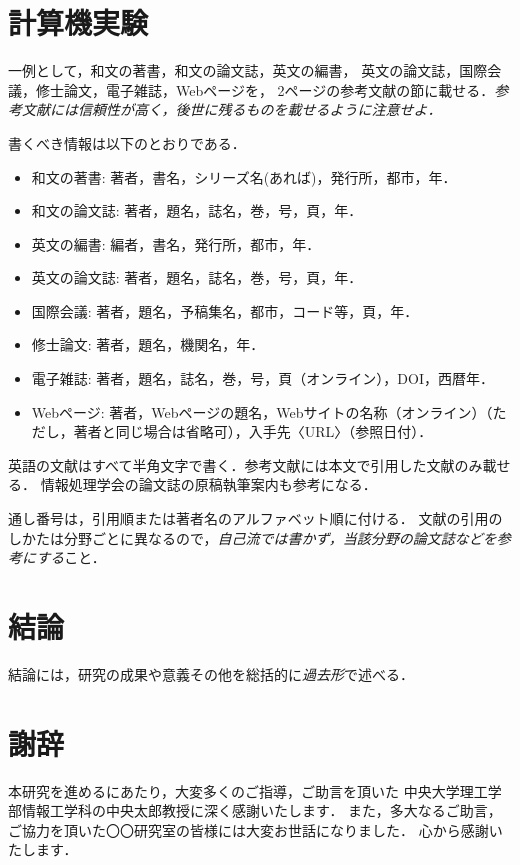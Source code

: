 \documentclass[a4j,12pt]{jreport}
\def\syaji{ \chapter*{謝辞} \addcontentsline{toc}{chapter}{謝辞}}
\begin{document}
\chapter{計算機実験} \label{chapter:5}

一例として，和文の著書\cite{suetake}，和文の論文誌\cite{kusano}，英文の編書\cite{fuortes}，
英文の論文誌\cite{rice}，国際会議\cite{guibas}，修士論文\cite{chudai}，電子雑誌\cite{iwama}，Webページ\cite{IPSJ}を，
2ページの参考文献の節に載せる．{\em 参考文献には信頼性が高く，後世に残るものを載せるように注意せよ．}

書くべき情報は以下のとおりである．
\begin{itemize}
\item 和文の著書: 著者，書名，シリーズ名(あれば)，発行所，都市，年．
\item 和文の論文誌: 著者，題名，誌名，巻，号，頁，年．
\item 英文の編書: 編者，書名，発行所，都市，年．
\item 英文の論文誌: 著者，題名，誌名，巻，号，頁，年．
\item 国際会議: 著者，題名，予稿集名，都市，コード等，頁，年．
\item 修士論文: 著者，題名，機関名，年．
\item 電子雑誌: 著者，題名，誌名，巻，号，頁（オンライン），DOI，西暦年．
\item Webページ: 著者，Webページの題名，Webサイトの名称（オンライン）（ただし，著者と同じ場合は省略可），入手先〈URL〉（参照日付）．
\end{itemize}
英語の文献はすべて半角文字で書く．参考文献には本文で引用した文献のみ載せる．
情報処理学会の論文誌の原稿執筆案内\cite{IPSJ}も参考になる．

通し番号は，引用順または著者名のアルファベット順に付ける．
文献の引用のしかたは分野ごとに異なるので，{\em 自己流では書かず，当該分野の論文誌などを参考にする}こと．



\chapter{結論} \label{chapter:6}

結論には，研究の成果や意義その他を総括的に{\em 過去形}で述べる．



\syaji
\par
本研究を進めるにあたり，大変多くのご指導，ご助言を頂いた
中央大学理工学部情報工学科の中央太郎教授に深く感謝いたします．
また，多大なるご助言，ご協力を頂いた〇〇研究室の皆様には大変お世話になりました．
心から感謝いたします．
\end{document}
